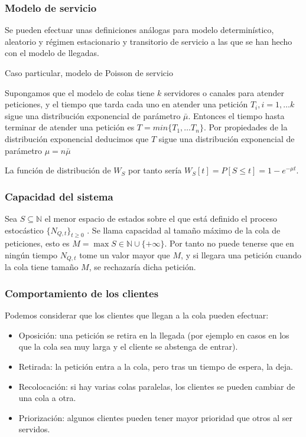 \documentclass[8pt]{beamer}
\begin{document}
  \begin{frame}\frametitle{Modelo de servicio}
    Se pueden efectuar unas definiciones análogas para modelo determinístico, aleatorio y régimen estacionario y transitorio
    de servicio a las que se han hecho con el modelo de llegadas.

    \begin{block}{Caso particular, modelo de Poisson de servicio}

      Supongamos que el modelo de colas tiene $k$ servidores o canales para atender peticiones, y el tiempo que 
      tarda cada uno en atender una petición $T_i, i=1,\ldots k$ sigue una distribución exponencial de parámetro $\bar{\mu}$.
      Entonces el tiempo hasta terminar de atender una petición es $T = min\{T_1, \ldots T_n\}$. Por propiedades de la
      distribución exponencial deducimos que $T$ sigue una distribución exponencial de parámetro $\mu = n \bar{\mu}$
      
      La función de distribución de $W_S$ por tanto sería $W_S[t] = P[S\le t] = 1 - e^{-\mu t}$.

    \end{block}


  \end{frame}
  \begin{frame}\frametitle{Capacidad del sistema}
    Sea $S\subseteq \mathbb{N}$ el menor espacio de estados sobre el que está definido el proceso estocástico $\{N_{Q,t}\}_{t\ge 0}$ . 
    Se llama capacidad al tamaño máximo de la cola de peticiones, esto es $M = \max S \in \mathbb{N} \cup \{+\infty\}$. 
    Por tanto no puede tenerse que en ningún tiempo $N_{Q,t}$ tome un valor mayor que $M$, y si llegara una
    petición cuando la cola tiene tamaño $M$, se rechazaría dicha petición.
  \end{frame}
  \begin{frame}\frametitle{Comportamiento de los clientes}
    Podemos considerar que los clientes que llegan a la cola pueden efectuar:

    \begin{itemize}
    \item Oposición: una petición se retira en la llegada (por ejemplo en casos en los que la cola sea muy larga
      y el cliente se abstenga de entrar).
    \item Retirada: la petición entra a la cola, pero tras un tiempo de espera, la deja.
    \item Recolocación: si hay varias colas paralelas, los clientes se pueden cambiar de una cola a otra.
    \item Priorización: algunos clientes pueden tener mayor prioridad que otros al ser servidos.
    \end{itemize}

  \end{frame}
\end{document}
